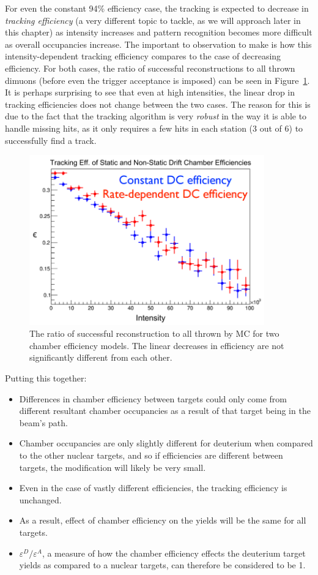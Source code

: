 For even the constant 94\% efficiency case, the tracking is expected to decrease in \emph{tracking efficiency} (a very different topic to tackle, as we will approach later in this chapter) as intensity increases and pattern recognition becomes more difficult as overall occupancies increase. The important to observation to make is how this intensity-dependent tracking efficiency compares to the case of decreasing efficiency. For both cases, the ratio of successful reconstructions to all thrown dimuons (before even the trigger acceptance is imposed) can be seen in Figure~\ref{fig:ktrack-eff-int}. It is perhaps surprising to see that even at high intensities, the linear drop in tracking efficiencies does not change between the two cases. The reason for this is due to the fact that the tracking algorithm is very \emph{robust} in the way it is able to handle missing hits, as it only requires a few hits in each station (3 out of 6) to successfully find a track.
\begin{figure}
	\centering
	\includegraphics[width=4in]{figures/analysis/ktrack-eff-int.png}
	\caption{The ratio of successful reconstruction to all thrown by MC for two chamber efficiency models. The linear decreases in efficiency are not significantly different from each other.}
	\label{fig:ktrack-eff-int}
\end{figure}

Putting this together:
\begin{itemize}
	\item Differences in chamber efficiency between targets could only come from different resultant chamber occupancies as a result of that target being in the beam's path.
	\item Chamber occupancies are only slightly different for deuterium when compared to the other nuclear targets, and so if efficiencies are different between targets, the modification will likely be very small.
	\item Even in the case of vastly different efficiencies, the tracking efficiency is unchanged.
	\item As a result, effect of chamber efficiency on the yields will be the same for all targets.
	\item $\varepsilon^D/\varepsilon^A$, a measure of how the chamber efficiency effects the deuterium target yields as compared to a nuclear targets, can therefore be considered to be 1.
\end{itemize}


